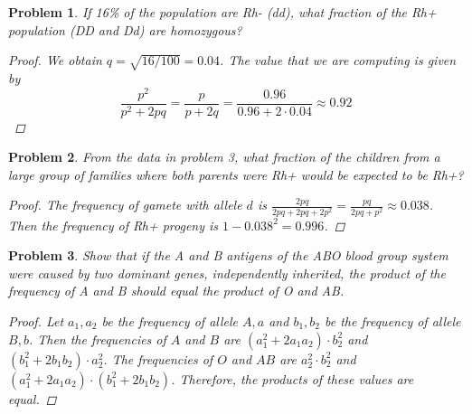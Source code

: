 \documentclass[12pt]{report}
\newtheorem{problem}{Problem}[chapter]
\begin{document}
        \begin{problem}
            If 16\% of the population are Rh- (dd), what fraction of the Rh+ population (DD and Dd) are homozygous?
            \begin{proof}
                We obtain $q = \sqrt{16/100} = 0.04$. 
                The value that we are computing is given by
                \begin{equation*}
                    \frac{p^2}{p^2+2pq} 
                    = \frac{p}{p+2q} 
                    = \frac{0.96}{0.96+2 \cdot 0.04}
                    \approx 0.92
                \end{equation*}
            \end{proof}
        \end{problem}

        \begin{problem}
            From the data in problem 3, what fraction of the children from a large group of families where both parents were Rh+ would be expected to be Rh+?
            \begin{proof}
                The frequency of gamete with allele $d$ is $\frac{2pq}{2pq+2pq+2p^2} = \frac{pq}{2pq+p^2} \approx 0.038$. 
                Then the frequency of Rh+ progeny is $1-0.038^2 = 0.996$.
            \end{proof}
        \end{problem}

        \begin{problem}
            Show that if the A and B antigens of the ABO blood group system were caused by two dominant genes, independently inherited, the product of the frequency of A and B should equal the product of O and AB.
            \begin{proof}
                Let $a_1, a_2$ be the frequency of allele $A, a$ and $b_1, b_2$ be the frequency of allele $B, b$.
                Then the frequencies of $A$ and $B$ are $(a_1^2+2a_1a_2) \cdot b_2^2$ and $(b_1^2+2b_1b_2) \cdot a_2^2$.
                The frequencies of $O$ and $AB$ are $a_2^2 \cdot b_2^2$ and $(a_1^2+2a_1a_2) \cdot (b_1^2+2b_1b_2)$.
                Therefore, the products of these values are equal.
            \end{proof}
        \end{problem}
\end{document}
